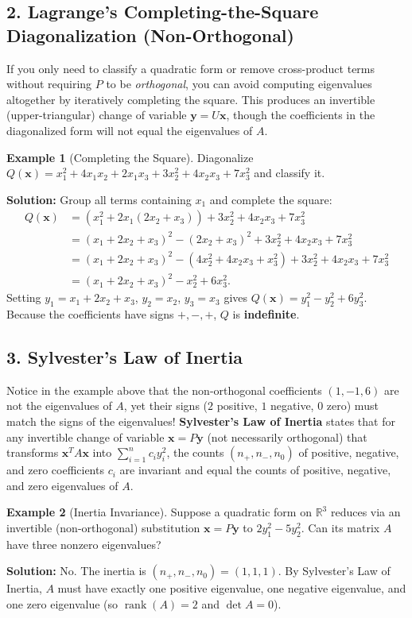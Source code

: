 \documentclass[11pt, letterpaper]{article}
\theoremstyle{definition}
\newtheorem{example}{Example}[section]
\theoremstyle{remark}
\begin{document}
\subsection{2. Lagrange's Completing-the-Square Diagonalization (Non-Orthogonal)}
If you only need to classify a quadratic form or remove cross-product terms without requiring $P$ to be \emph{orthogonal}, you can avoid computing eigenvalues altogether by iteratively completing the square. This produces an invertible (upper-triangular) change of variable $\mathbf{y} = U\mathbf{x}$, though the coefficients in the diagonalized form will not equal the eigenvalues of $A$.

\begin{example}[Completing the Square]
Diagonalize $Q(\mathbf{x}) = x_1^2 + 4x_1x_2 + 2x_1x_3 + 3x_2^2 + 4x_2x_3 + 7x_3^2$ and classify it.

\textbf{Solution:} Group all terms containing $x_1$ and complete the square:
\begin{align*}
Q(\mathbf{x}) &= \left(x_1^2 + 2x_1(2x_2 + x_3)\right) + 3x_2^2 + 4x_2x_3 + 7x_3^2 \\
&= (x_1 + 2x_2 + x_3)^2 - (2x_2 + x_3)^2 + 3x_2^2 + 4x_2x_3 + 7x_3^2 \\
&= (x_1 + 2x_2 + x_3)^2 - (4x_2^2 + 4x_2x_3 + x_3^2) + 3x_2^2 + 4x_2x_3 + 7x_3^2 \\
&= (x_1 + 2x_2 + x_3)^2 - x_2^2 + 6x_3^2.
\end{align*}
Setting $y_1 = x_1 + 2x_2 + x_3$, $y_2 = x_2$, $y_3 = x_3$ gives $Q(\mathbf{x}) = y_1^2 - y_2^2 + 6y_3^2$. Because the coefficients have signs $+, -, +$, $Q$ is \textbf{indefinite}.
\end{example}

\subsection{3. Sylvester's Law of Inertia}
Notice in the example above that the non-orthogonal coefficients $(1, -1, 6)$ are not the eigenvalues of $A$, yet their signs ($2$ positive, $1$ negative, $0$ zero) must match the signs of the eigenvalues! \textbf{Sylvester's Law of Inertia} states that for any invertible change of variable $\mathbf{x} = P\mathbf{y}$ (not necessarily orthogonal) that transforms $\mathbf{x}^T A \mathbf{x}$ into $\sum_{i=1}^n c_i y_i^2$, the counts $(n_+, n_-, n_0)$ of positive, negative, and zero coefficients $c_i$ are invariant and equal the counts of positive, negative, and zero eigenvalues of $A$.

\begin{example}[Inertia Invariance]
Suppose a quadratic form on $\mathbb{R}^3$ reduces via an invertible (non-orthogonal) substitution $\mathbf{x} = P\mathbf{y}$ to $2y_1^2 - 5y_2^2$. Can its matrix $A$ have three nonzero eigenvalues?

\textbf{Solution:} No. The inertia is $(n_+, n_-, n_0) = (1, 1, 1)$. By Sylvester's Law of Inertia, $A$ must have exactly one positive eigenvalue, one negative eigenvalue, and one zero eigenvalue (so $\operatorname{rank}(A) = 2$ and $\det A = 0$).
\end{example}
\end{document}
